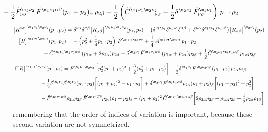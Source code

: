 \documentclass[a4paper,11pt,openright,twoside]{book}
\let\a=\alpha   \let\b=\beta   \let\g=\gamma   \let\d=\delta
\let\n=\nu      \let\x=\xi     \let\p=\pi      \let\r=\rho
\let\s=\sigma  \let\t=\tau     \let\u=\upsilon \let\f=\phi
\newcommand{\sdfrac}[2]{\mbox{\small$\displaystyle\frac{#1}{#2}$}}
\numberwithin{equation}{section}
\begin{document}
{{\begin{align}
	&\hspace{-1.5cm}-\frac{1}{2}\tilde F^{\m_2\n_2}_{\n\s}\,\tilde F^{\m_1\n_1\a\b}(p_1+p_2)_\a\,p_{2\b}-\frac{1}{2}\left(\tilde C^{\m_1\n_1\m_2\n_2}_{\hspace{1.25cm}\n\s}-\frac{1}{2}\d^{\m_2\n_2}\,\tilde F^{\m_1\n_1}_{\n\s}\right)\,p_1\cdot p_2
\end{align}
\begin{align}
	\big[R^{\n\s}\big]^{\m_1\n_1\m_2\n_2}(p_1,p_2)&=\d^{\n\a}\d^{\s\b}\big[R_{\a\b}\big]^{\m_1\n_1\m_2\n_2}(p_1,p_2)-\big(\d^{\n(\m_1}\d^{\n_1)\a}\d^{\s\b}+\d^{\n\a}\d^{\s(\m_1}\d^{\n_1)\b}\big)\big[R_{\a\b}\big]^{\m_2\n_2}(p_2)\\
	\big[R\big]^{\m_1\n_1\m_2\n_2}(p_1,p_2)&=-\left(p_2^2+\sdfrac{1}{4}p_1\cdot p_2\right)\,\tilde F^{\m_1\n_1\m_2\n_2}+\frac{1}{4}\,A^{\m_1\n_1\m_2\n_2}\,p_1\cdot p_2\notag\\
	&\hspace{-1.5cm}+\tilde C^{\m_1\n_1\m_2\n_2\a\b}\,(p_{1\a}+2p_{2\a})p_{2\b}-\d^{\m_2\n_2}\tilde F^{\m_1\n_1\a\b}\,(p_{1\a}+p_{2\a})p_{2\b}+\sdfrac{1}{2}\tilde C^{\m_2\n_2\m_1\n_1\a\b}\,p_{1\a}p_{2\b}
\end{align}
\begin{align}
	\big[\square R\big]^{\m_1\n_1\m_2\n_2}(p_1,p_2)&=\tilde F^{\m_1\n_1\m_2\n_2}\,\bigg[p_2^2(p_1+p_2)^2+\sdfrac{3}{2}(p_2^2+p_1\cdot p_2)\bigg]+\sdfrac{1}{2}\d^{\m_1\n_1}\tilde F^{\m_2\n_2\a\b}(p_1\cdot p_2)\,p_{2\a}p_{2\b}\notag\\
	&\hspace{-1.5cm}-\sdfrac{1}{2}\d^{\m_1\n_1}\d^{\m_2\n_2}(p_1\cdot p_2)\bigg[(p_1+p_2)^2-p_1\cdot p_2\bigg]+\d^{\m_2\n_2}F^{\m_1\n_1\a\b}p_{2\a}(p_1+p_2)_\b\bigg[(p_1+p_2)^2+p_2^2\bigg]\notag\\
	&\hspace{-1.5cm}-\tilde F^{\m_2\n_2\a\b}p_{2\a}p_{2\b}\,\tilde F^{\m_1\n_1\Gamma\d}p_{2\g}(p_1+p_2)_\d-(p_1+p_2)^2\,\tilde C^{\m_1\n_1\m_2\n_2\a\b}\bigg[2p_{2\a}p_{2\b}+p_{1\a}p_{2\b}+\sdfrac{1}{2}p_{2\a}p_{1\b}\bigg]
\end{align}
remembering that the order of indices of variation is important, because these second variation are not symmetrized. 

}}
\end{document}
